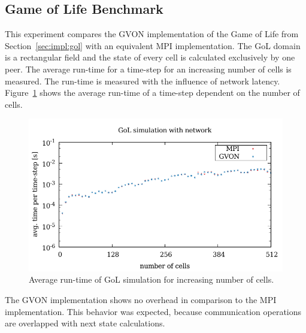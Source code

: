 \subsection{Game of Life Benchmark}
This experiment compares the GVON implementation of the Game of Life
from Section~\ref{sec:impl:gol} with an equivalent MPI
implementation. The GoL domain is a rectangular field and the state of
every cell is calculated exclusively by one peer. The average run-time
for a time-step for an increasing number of cells is measured. The
run-time is measured with the influence of network latency.
Figure~\ref{fig:gol_laser} shows the average run-time of a time-step
dependent on the number of cells.

\begin{figure}[H]
  \includegraphics[width=\textwidth]{plots/50_gol_network_laser}
  \caption{Average run-time of GoL simulation for increasing number
    of cells.}
  \label{fig:gol_laser}
\end{figure}

\noindent The GVON implementation shows no overhead in comparison to
the MPI implementation. This behavior was expected, because
communication operations are overlapped with next state calculations.


